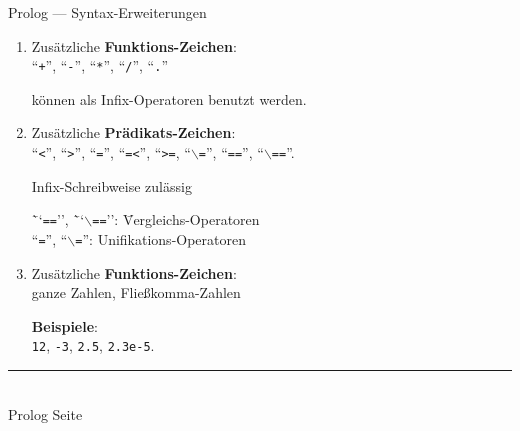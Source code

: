 \documentclass{slides}
\newcommand{\myrule}{\rule{20cm}{1mm}\\ }
\newcounter{mypage}
\begin{document}
\begin{slide}{}
\normalsize
\begin{center}
Prolog --- Syntax-Erweiterungen
\end{center}
\vspace{0.5cm}

\footnotesize
\begin{enumerate}
\item Zus\"{a}tzliche \textbf{Funktions-Zeichen}: \\[0.3cm]
      \hspace*{1.3cm} 
      ``\texttt{+}'', ``\texttt{-}'', ``\texttt{*}'', ``\texttt{/}'', ``\texttt{.}'' 

      k\"{o}nnen als Infix-Operatoren benutzt werden.
\item Zus\"{a}tzliche \textbf{Pr\"{a}dikats-Zeichen}: \\[0.3cm]
      \hspace*{1.3cm} 
      ``\texttt{<}'', ``\texttt{>}'', ``\texttt{=}'', ``\texttt{=<}'', ``\texttt{>=}, 
      ``\texttt{$\backslash$=}'', ``\texttt{==}'', ``\texttt{$\backslash$==}''.

      Infix-Schreibweise zul\"{a}ssig
      
      \begin{tabbing}
      \hspace*{1.3cm} \= ``\texttt{==}'', \= ``\texttt{$\backslash$==}'': \= Vergleichs-Operatoren \\[0.3cm]
                      \> ``\texttt{=}'',  \> ``\texttt{$\backslash$=}'':  \> Unifikations-Operatoren        
      \end{tabbing}

\item Zus\"{a}tzliche \textbf{Funktions-Zeichen}: \\[0.3cm] 
      \hspace*{1.3cm} ganze Zahlen, Fließkomma-Zahlen

      \textbf{Beispiele}: 
      \\[0.3cm]
      \hspace*{1.3cm}
      \texttt{12}, \texttt{-3}, \texttt{2.5}, \texttt{2.3e-5}.
\end{enumerate}



\vspace*{\fill}
\tiny \addtocounter{mypage}{1}
\myrule
Prolog  \hspace*{\fill} Seite 
\end{slide}
\end{document}
